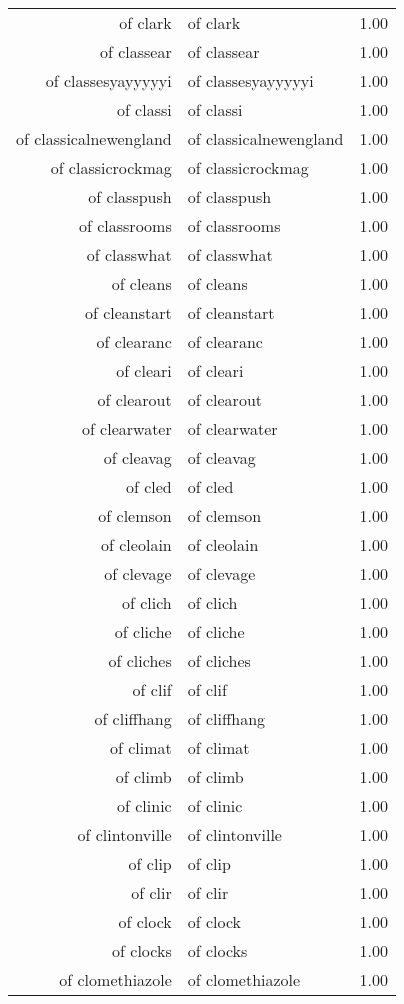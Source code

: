 \begin{table}[ht]
\begin{tabular}{rlr}
  of clark & of clark & 1.00 \\ 
  of classear & of classear & 1.00 \\ 
  of classesyayyyyyi & of classesyayyyyyi & 1.00 \\ 
  of classi & of classi & 1.00 \\ 
  of classicalnewengland & of classicalnewengland & 1.00 \\ 
  of classicrockmag & of classicrockmag & 1.00 \\ 
  of classpush & of classpush & 1.00 \\ 
  of classrooms & of classrooms & 1.00 \\ 
  of classwhat & of classwhat & 1.00 \\ 
  of cleans & of cleans & 1.00 \\ 
  of cleanstart & of cleanstart & 1.00 \\ 
  of clearanc & of clearanc & 1.00 \\ 
  of cleari & of cleari & 1.00 \\ 
  of clearout & of clearout & 1.00 \\ 
  of clearwater & of clearwater & 1.00 \\ 
  of cleavag & of cleavag & 1.00 \\ 
  of cled & of cled & 1.00 \\ 
  of clemson & of clemson & 1.00 \\ 
  of cleolain & of cleolain & 1.00 \\ 
  of clevage & of clevage & 1.00 \\ 
  of clich & of clich & 1.00 \\ 
  of cliche & of cliche & 1.00 \\ 
  of cliches & of cliches & 1.00 \\ 
  of clif & of clif & 1.00 \\ 
  of cliffhang & of cliffhang & 1.00 \\ 
  of climat & of climat & 1.00 \\ 
  of climb & of climb & 1.00 \\ 
  of clinic & of clinic & 1.00 \\ 
  of clintonville & of clintonville & 1.00 \\ 
  of clip & of clip & 1.00 \\ 
  of clir & of clir & 1.00 \\ 
  of clock & of clock & 1.00 \\ 
  of clocks & of clocks & 1.00 \\ 
  of clomethiazole & of clomethiazole & 1.00 \\ 

\end{tabular}
\end{table}
